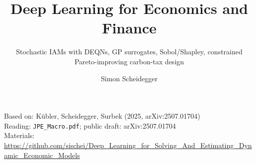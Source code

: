 \documentclass[aspectratio=169,11pt]{beamer}
\title[Deep Learning for Dynamic Economic Models]
{Deep Learning for Economics and Finance}
\subtitle{Stochastic IAMs with DEQNs, GP surrogates, Sobol/Shapley, constrained Pareto-improving carbon-tax design}
\author{Simon Scheidegger}
\institute[HEC Lausanne]{HEC, University of Lausanne}
\date{}
\begin{document}
\newcommand{\exercisepause}{%
  \tikz[baseline=(X.base)]{\node[fill=darkgreen!80!black, text=white,
  rounded corners=2pt, inner sep=3pt, font=\scriptsize\bfseries](X){PAUSE --- 5 min};}}



{
\begin{frame}
\titlepage
\vspace{-0.4cm}
\begin{center}
{\footnotesize Based on: K\"ubler, Scheidegger, Surbek (2025, arXiv:2507.01704)}\\[2pt]
{\footnotesize Reading: \texttt{JPE\_Macro.pdf}; public draft: arXiv:2507.01704}\\[4pt]
{\footnotesize Materials: \url{https://github.com/sischei/Deep_Learning_for_Solving_And_Estimating_Dynamic_Economic_Models}}
\end{center}
\end{frame}
}
\end{document}
